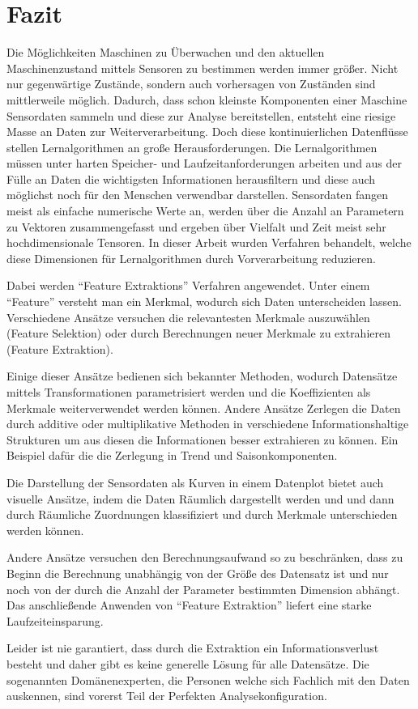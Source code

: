 \section{Fazit}
Die Möglichkeiten Maschinen zu Überwachen und den aktuellen Maschinenzustand mittels Sensoren zu bestimmen werden immer größer. Nicht nur gegenwärtige Zustände, sondern auch vorhersagen von Zuständen sind mittlerweile möglich. Dadurch, dass schon kleinste Komponenten einer Maschine Sensordaten sammeln und diese zur Analyse bereitstellen, entsteht eine riesige Masse an Daten zur Weiterverarbeitung. Doch diese kontinuierlichen Datenflüsse stellen Lernalgorithmen an große Herausforderungen. 
Die Lernalgorithmen müssen unter harten Speicher- und Laufzeitanforderungen arbeiten und aus der Fülle an Daten die wichtigsten Informationen herausfiltern und diese auch möglichst noch für den Menschen verwendbar darstellen. 
Sensordaten fangen meist als einfache numerische Werte an, werden über die Anzahl an Parametern zu Vektoren zusammengefasst und ergeben über Vielfalt und Zeit meist sehr hochdimensionale Tensoren. In dieser Arbeit wurden Verfahren behandelt, welche diese Dimensionen für Lernalgorithmen durch Vorverarbeitung reduzieren.

Dabei werden \enquote{Feature Extraktions} Verfahren angewendet. Unter einem \enquote{Feature} versteht man ein Merkmal, wodurch sich Daten unterscheiden lassen. Verschiedene Ansätze versuchen die relevantesten Merkmale auszuwählen (Feature Selektion) oder durch Berechnungen neuer Merkmale zu extrahieren (Feature Extraktion). 

Einige dieser Ansätze bedienen sich bekannter Methoden, wodurch Datensätze mittels Transformationen parametrisiert werden und die Koeffizienten als Merkmale weiterverwendet werden können. Andere Ansätze Zerlegen die Daten durch additive oder multiplikative Methoden in verschiedene Informationshaltige Strukturen um aus diesen die Informationen besser extrahieren zu können. Ein Beispiel dafür die die Zerlegung in Trend und Saisonkomponenten.

Die Darstellung der Sensordaten als Kurven in einem Datenplot bietet auch visuelle Ansätze, indem die Daten Räumlich dargestellt werden und und dann durch Räumliche Zuordnungen klassifiziert und durch Merkmale unterschieden werden können. 

Andere Ansätze versuchen den Berechnungsaufwand so zu beschränken, dass zu Beginn die Berechnung unabhängig von der Größe des Datensatz ist und nur noch von der durch die Anzahl der Parameter bestimmten Dimension abhängt. Das anschließende Anwenden von \enquote{Feature Extraktion} liefert eine starke Laufzeiteinsparung.

Leider ist nie garantiert, dass durch die Extraktion ein Informationsverlust besteht und daher gibt es keine generelle Lösung für alle Datensätze. Die sogenannten Domänenexperten, die Personen welche sich Fachlich mit den Daten auskennen, sind vorerst Teil der Perfekten Analysekonfiguration. 
